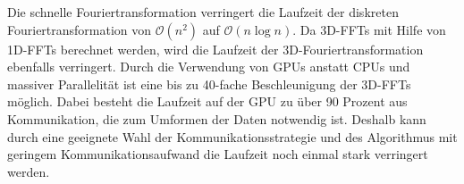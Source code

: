 Die schnelle Fouriertransformation verringert die Laufzeit der diskreten Fouriertransformation von $\mathcal O(n^2)$ auf $\mathcal O(n \log n)$. Da 3D-FFTs mit Hilfe von 1D-FFTs berechnet werden, wird die Laufzeit der  3D-Fouriertransformation ebenfalls verringert. 
\newline
Durch die Verwendung von GPUs anstatt CPUs und massiver Parallelität ist eine bis zu 40-fache Beschleunigung der 3D-FFTs möglich. Dabei besteht die Laufzeit auf der GPU zu über 90 Prozent aus Kommunikation, die zum Umformen der Daten notwendig ist. Deshalb kann durch eine geeignete Wahl der Kommunikationsstrategie und des Algorithmus mit geringem Kommunikationsaufwand die Laufzeit noch einmal stark verringert werden.

